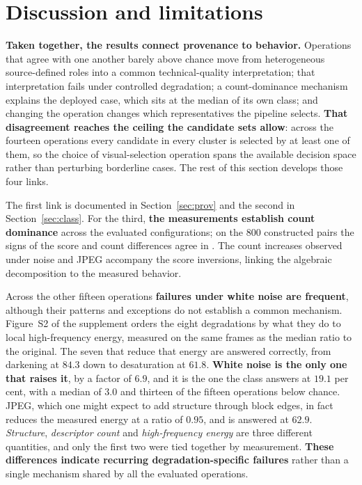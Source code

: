 \section{Discussion and limitations}\label{sec:discussion}

\textbf{Taken together, the results connect provenance to behavior.} Operations that agree with one another barely above chance move from heterogeneous
source-defined roles into a common technical-quality interpretation; that interpretation
fails under controlled degradation; a count-dominance mechanism explains the deployed case,
which sits at the median of its own class; and changing the operation changes which representatives the pipeline selects.
\textbf{That disagreement reaches the ceiling the candidate sets allow}: across the
fourteen operations every candidate in every cluster is selected by at least one of them,
so the choice of visual-selection operation spans the available decision space rather than
perturbing borderline cases. The rest of this section develops those four links.

The first link is documented in Section~\ref{sec:prov} and the second in
Section~\ref{sec:class}. For the third, \textbf{the measurements establish count dominance}
across the evaluated configurations; on the 800
constructed pairs the signs of the score and count differences agree in \mecConcordam{}. The count
increases observed under noise and JPEG accompany the score inversions, linking the
algebraic decomposition to the measured behavior.

Across the other fifteen operations \textbf{failures under white noise are frequent},
although their patterns and exceptions do not establish a common mechanism. Figure~S2 of the supplement orders the eight
degradations by what they do to local high-frequency energy, measured on the same frames
as the median ratio to the original. The seven that reduce that energy are answered
correctly, from darkening at $84.3$ down to desaturation at $61.8$. \textbf{White noise is the only one that raises it}, by a factor of $6.9$, and it is the
one the class answers at $19.1$ per cent, with a median of $3.0$ and thirteen of the fifteen operations below
chance. JPEG, which one might expect to add structure through
block edges, in fact reduces the measured energy at a ratio of $0.95$, and is answered at
$62.9$. \emph{Structure}, \emph{descriptor count} and \emph{high-frequency energy} are
three different quantities, and only the first two were tied together by measurement.
\textbf{These differences indicate recurring degradation-specific failures} rather than a
single mechanism shared by all the evaluated operations.

